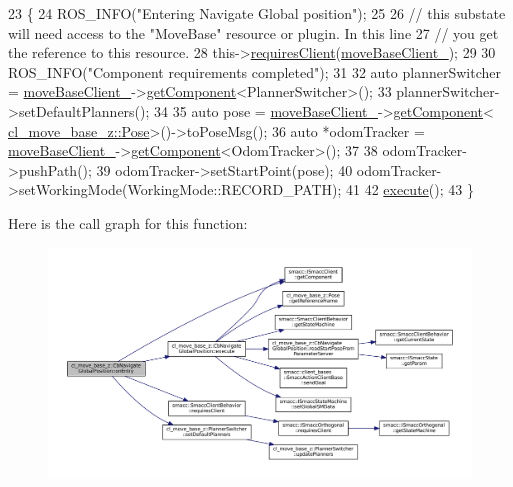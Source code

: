 \begin{DoxyCode}
23 \{
24     ROS\_INFO(\textcolor{stringliteral}{"Entering Navigate Global position"});
25 
26     \textcolor{comment}{// this substate will need access to the "MoveBase" resource or plugin. In this line}
27     \textcolor{comment}{// you get the reference to this resource.}
28     this->\hyperlink{classsmacc_1_1SmaccClientBehavior_a917f001e763a1059af337bf4e164f542}{requiresClient}(\hyperlink{classcl__move__base__z_1_1CbNavigateGlobalPosition_a460d6b43834cb52baa94d22cd3a6fd2b}{moveBaseClient\_});
29 
30     ROS\_INFO(\textcolor{stringliteral}{"Component requirements completed"});
31 
32     \textcolor{keyword}{auto} plannerSwitcher = \hyperlink{classcl__move__base__z_1_1CbNavigateGlobalPosition_a460d6b43834cb52baa94d22cd3a6fd2b}{moveBaseClient\_}->\hyperlink{classsmacc_1_1ISmaccClient_adef78db601749ca63c19e74a27cb88cc}{getComponent}<PlannerSwitcher>();
33     plannerSwitcher->setDefaultPlanners();
34 
35     \textcolor{keyword}{auto} pose = \hyperlink{classcl__move__base__z_1_1CbNavigateGlobalPosition_a460d6b43834cb52baa94d22cd3a6fd2b}{moveBaseClient\_}->\hyperlink{classsmacc_1_1ISmaccClient_adef78db601749ca63c19e74a27cb88cc}{getComponent}<
      \hyperlink{classcl__move__base__z_1_1Pose}{cl\_move\_base\_z::Pose}>()->toPoseMsg();
36     \textcolor{keyword}{auto} *odomTracker = \hyperlink{classcl__move__base__z_1_1CbNavigateGlobalPosition_a460d6b43834cb52baa94d22cd3a6fd2b}{moveBaseClient\_}->\hyperlink{classsmacc_1_1ISmaccClient_adef78db601749ca63c19e74a27cb88cc}{getComponent}<OdomTracker>();
37 
38     odomTracker->pushPath();
39     odomTracker->setStartPoint(pose);
40     odomTracker->setWorkingMode(WorkingMode::RECORD\_PATH);
41 
42     \hyperlink{classcl__move__base__z_1_1CbNavigateGlobalPosition_a0b8525ea9e4388b27cb1f9b1e06a3b63}{execute}();
43 \}
\end{DoxyCode}
Here is the call graph for this function\+:
\nopagebreak
\begin{figure}[H]
\begin{center}
\leavevmode
\includegraphics[width=350pt]{classcl__move__base__z_1_1CbNavigateGlobalPosition_a66d8b0555ef2945bc108dcd5171be292_cgraph}
\end{center}
\end{figure}
